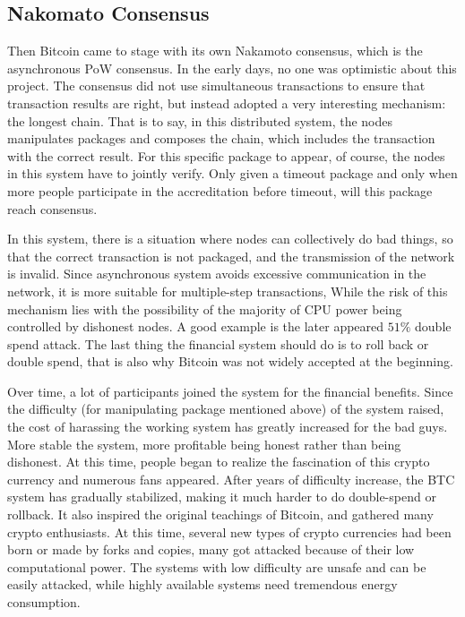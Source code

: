 \subsection{Nakomato Consensus}
\begin{flushleft}
    Then Bitcoin came to stage with its own Nakamoto consensus, which is the asynchronous PoW consensus. In the early days, no one was optimistic about this project. The consensus did not use simultaneous transactions to ensure that transaction results are right, but instead adopted a very interesting mechanism: the longest chain. That is to say, in this distributed system, the nodes manipulates packages and composes the chain, which includes the transaction with the correct result. For this specific package to appear, of course, the nodes in this system have to jointly verify. Only given a timeout package and only when more people participate in the accreditation before timeout, will this package reach consensus.
\end{flushleft}
\begin{flushleft}
    In this system, there is a situation where nodes can collectively do bad things, so that the correct transaction is not packaged, and the transmission of the network is invalid. Since asynchronous system avoids excessive communication in the network, it is more suitable for multiple-step transactions, While the risk of this mechanism lies with the possibility of the majority of CPU power being controlled by dishonest nodes. A good example is the later appeared $51\%$ double spend attack. The last thing the financial system should do is to roll back or double spend, that is also why Bitcoin was not widely accepted at the beginning.
\end{flushleft}
\begin{flushleft}
    Over time, a lot of participants joined the system for the financial benefits. Since the difficulty (for manipulating package mentioned above) of the system raised, the cost of harassing the working system has greatly increased for the bad guys. More stable the system, more profitable being honest rather than being dishonest. At this time, people began to realize the fascination of this crypto currency and numerous fans appeared. After years of difficulty increase, the BTC system has gradually stabilized, making it much harder to do double-spend or rollback. It also inspired the original teachings of Bitcoin, and gathered many crypto enthusiasts. At this time, several new types of crypto currencies had been born or made by forks and copies, many got attacked because of their low computational power. The systems with low difficulty are unsafe and can be easily attacked, while highly available systems need tremendous energy consumption.
\end{flushleft}
